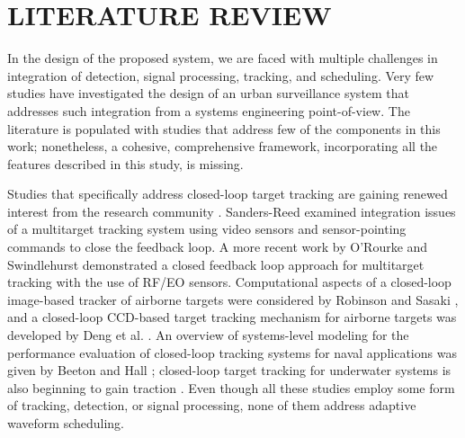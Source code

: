 \documentclass[times]{asjcauth}
\begin{document}
\section{LITERATURE REVIEW}
\label{seclit}

In the design of the proposed system, we are faced with multiple challenges in integration of detection, signal processing, tracking, and scheduling. Very few studies have investigated the design of an urban surveillance system that addresses such integration from a systems engineering point-of-view. The literature is populated with studies that address few of the components in this work; nonetheless, a cohesive, comprehensive framework, incorporating all the features described in this study, is missing.

Studies that specifically address closed-loop target tracking are gaining renewed interest from the research community \cite{movpath,rad1,rad2}. Sanders-Reed \cite{sanders2004multitarget} examined integration issues of a multitarget tracking system using video sensors and sensor-pointing commands to close the feedback loop. A more recent work by O'Rourke and Swindlehurst \cite{Rourke} demonstrated a closed feedback loop approach for multitarget tracking with the use of RF/EO sensors. Computational aspects of a closed-loop image-based tracker of airborne targets were considered by Robinson and Sasaki \cite{robinson2000software}, and a closed-loop CCD-based target tracking mechanism for airborne targets was developed by Deng et al. \cite{ccd2017}.  An overview of systems-level modeling for the performance evaluation of closed-loop tracking systems for naval applications was given by Beeton and Hall \cite{BHall}; closed-loop target tracking for underwater systems is also beginning to gain traction \cite{underwat}. Even though all these studies employ some form of tracking, detection, or signal processing, none of them address adaptive waveform scheduling.
\end{document}
